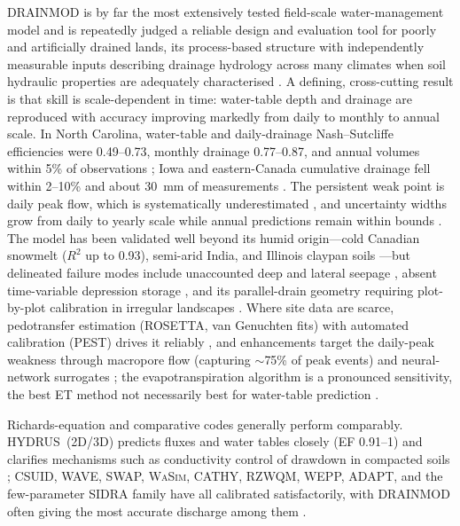 \textsc{DRAINMOD} is by far the most extensively tested field-scale
water-management model and is repeatedly judged a reliable design and
evaluation tool for poorly and artificially drained lands, its process-based
structure with independently measurable inputs describing drainage hydrology
across many climates when soil hydraulic properties are adequately
characterised \parencite{Singh2019b,Gowda2012}. A defining, cross-cutting
result is that skill is scale-dependent in time: water-table depth and
drainage are reproduced with accuracy improving markedly from daily to monthly
to annual scale. In North Carolina, water-table and daily-drainage
Nash--Sutcliffe efficiencies were 0.49--0.73, monthly drainage 0.77--0.87, and
annual volumes within 5\% of observations \parencite{Gowda2012}; Iowa and
eastern-Canada cumulative drainage fell within 2--10\% and about 30~mm of
measurements \parencite{Singh2006b,Dayyani2009}. The persistent weak point is
daily peak flow, which is systematically underestimated
\parencite{Morrison2014,Singh1996}, and uncertainty widths grow from daily to
yearly scale while annual predictions remain within bounds \parencite{Wang2006}.
The model has been validated well beyond its humid origin---cold Canadian
snowmelt ($R^2$ up to 0.93), semi-arid India, and Illinois claypan soils
\parencite{Dayyani2009,GUPTA1993,MOSTAGHIMI1989,Abduljaleel2023,Awad2022b}---but
delineated failure modes include unaccounted deep and lateral seepage
\parencite{Sinai2006}, absent time-variable depression storage
\parencite{Abduljaleel2023}, and its parallel-drain geometry requiring
plot-by-plot calibration in irregular landscapes \parencite{He2002}. Where
site data are scarce, pedotransfer estimation (ROSETTA, van Genuchten fits)
with automated calibration (PEST) drives it reliably
\parencite{Singh2006b,Qi2015,Malota2024,Malota2015}, and enhancements target
the daily-peak weakness through macropore flow (capturing $\sim$75\% of peak
events) and neural-network surrogates \parencite{Askar2020,Awad2022,Awad2022b};
the evapotranspiration algorithm is a pronounced sensitivity, the best ET
method not necessarily best for water-table prediction
\parencite{Malakshahi2020}.

Richards-equation and comparative codes generally perform comparably.
HYDRUS~(2D/3D) predicts fluxes and water tables closely (EF 0.91--1) and
clarifies mechanisms such as conductivity control of drawdown in compacted
soils \parencite{Karandish2018,DarziNaftchali2018,Mante2018,Guedessou2021,Ebrahimian2015};
CSUID, WAVE, SWAP, \textsc{WaSim}, CATHY, RZWQM, WEPP, ADAPT, and the
few-parameter \textsc{SIDRA} family have all calibrated satisfactorily, with
\textsc{DRAINMOD} often giving the most accurate discharge among them
\parencite{Alzraiee2013b,Alzraiee2013,ElSadek2001,Prasher1996,Verma2014,Malota2022,Muma2017,Malone2014,Xian2017,RevueltaAcosta2021,Mendez2004,Zimmer2023,Henine2022,LESAFFRE1988}.

